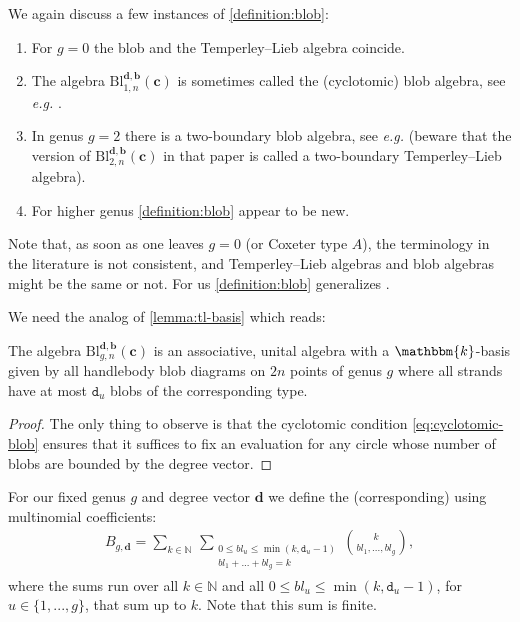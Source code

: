 \documentclass[a4paper,11pt]{amsart}
\let\emph\relax
\newcommand{\eg}{\textsl{e.g.}}
\renewcommand{\dots}{\text{...}}
\newcommand{\setstuff}[1]{\mathrm{#1}}
\newcommand{\KK}{\mathbbm{k}}
\newcommand{\N}{\mathbb{N}}
\newcommand{\bsym}[1]{\boldsymbol{#1}}
\newcommand{\varsym}[1]{\mathtt{#1}}
\newcommand{\cpar}{\bsym{c}}
\newcommand{\bpar}{\bsym{b}}
\newcommand{\dpar}{\bsym{d}}
\newcommand{\dvar}{\varsym{d}}
\numberwithin{equation}{section}
\let\fullref\autoref
\begin{document}
\begin{remark}\label{remark:blob}
We again discuss a few instances of \fullref{definition:blob}:
\begin{enumerate}

\setlength\itemsep{0.15cm}

\item For $g=0$ the blob and the Temperley--Lieb algebra 
coincide.

\item The algebra $\setstuff{Bl}_{1,n}^{\dpar,\bpar}(\cpar)$ 
is sometimes called the (cyclotomic) blob algebra, see {\eg} \cite{MaSa-blob}.

\item In genus $g=2$ there is a two-boundary 
blob algebra, see {\eg} 
\cite{deGiNi-two-boundary-tl} (beware that the version of $\setstuff{Bl}_{2,n}^{\dpar,\bpar}(\cpar)$ 
in that paper is called a two-boundary 
Temperley--Lieb algebra).

\item For higher genus \fullref{definition:blob} appear to be new.

\end{enumerate}
Note that, as soon as one leaves $g=0$ (or Coxeter type $A$), 
the terminology in the literature is not consistent, and 
Temperley--Lieb algebras and blob algebras might 
be the same or not. For us \fullref{definition:blob} 
generalizes \cite{MaSa-blob}.
\end{remark}

We need the 
analog of \fullref{lemma:tl-basis} which reads:

\begin{lemma}\label{lemma:blob-basis}
The algebra 
$\setstuff{Bl}_{g,n}^{\dpar,\bpar}(\cpar)$ is an associative, unital 
algebra with a $\KK$-basis given by all handlebody blob diagrams 
on $2n$ points of genus 
$g$ where all strands have at most $\dvar_{u}$ 
blobs of the corresponding type.
\end{lemma}

\begin{proof}
The only thing to observe is that the cyclotomic condition \eqref{eq:cyclotomic-blob} 
ensures that it suffices to 
fix an evaluation for any circle whose number of blobs are bounded 
by the degree vector.
\end{proof}

For our fixed genus $g$ and degree vector $\dpar$ we define 
the (corresponding) \emph{blob numbers} using multinomial
coefficients:
\begin{gather}\label{eq:blob-numbers}
B_{g,\dpar}=
\sum_{k\in\N}\,
\sum_{\substack{0\leq bl_{u}\leq\min(k,\dvar_{u}-1)\\bl_{1}+\dots+bl_{g}=k}}
\binom{k}{bl_{1},\dots,bl_{g}},
\end{gather}
where the sums run over all $k\in\N$ and all 
$0\leq bl_{u}\leq\min(k,\dvar_{u}-1)$,
for $u\in\{1,\dots,g\}$, that sum up to $k$.
Note that this sum is finite.
\end{document}

